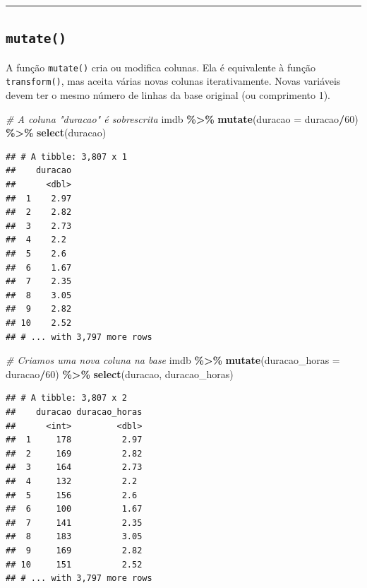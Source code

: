 \documentclass[
]{book}
\newenvironment{Shaded}{\begin{snugshade}}{\end{snugshade}}
\newcommand{\CommentTok}[1]{\textcolor[rgb]{0.56,0.35,0.01}{\textit{#1}}}
\newcommand{\DataTypeTok}[1]{\textcolor[rgb]{0.13,0.29,0.53}{#1}}
\newcommand{\DecValTok}[1]{\textcolor[rgb]{0.00,0.00,0.81}{#1}}
\newcommand{\KeywordTok}[1]{\textcolor[rgb]{0.13,0.29,0.53}{\textbf{#1}}}
\newcommand{\NormalTok}[1]{#1}
\newcommand{\OperatorTok}[1]{\textcolor[rgb]{0.81,0.36,0.00}{\textbf{#1}}}
\newcommand{\StringTok}[1]{\textcolor[rgb]{0.31,0.60,0.02}{#1}}
\begin{document}
\begin{center}\rule{0.5\linewidth}{0.5pt}\end{center}

\hypertarget{mutate}{%
\subsection{\texorpdfstring{\texttt{mutate()}}{mutate()}}\label{mutate}}

A função \texttt{mutate()} cria ou modifica colunas. Ela é equivalente à função \texttt{transform()}, mas aceita várias novas colunas iterativamente. Novas variáveis devem ter o mesmo número de linhas da base original (ou comprimento 1).

\begin{Shaded}
\begin{Highlighting}[]
\CommentTok{\# A coluna "duracao" é sobrescrita}
\NormalTok{imdb }\OperatorTok{\%>\%}
\StringTok{  }\KeywordTok{mutate}\NormalTok{(}\DataTypeTok{duracao =}\NormalTok{ duracao}\OperatorTok{/}\DecValTok{60}\NormalTok{) }\OperatorTok{\%>\%}
\StringTok{  }\KeywordTok{select}\NormalTok{(duracao)}
\end{Highlighting}
\end{Shaded}

\begin{verbatim}
## # A tibble: 3,807 x 1
##    duracao
##      <dbl>
##  1    2.97
##  2    2.82
##  3    2.73
##  4    2.2 
##  5    2.6 
##  6    1.67
##  7    2.35
##  8    3.05
##  9    2.82
## 10    2.52
## # ... with 3,797 more rows
\end{verbatim}

\begin{Shaded}
\begin{Highlighting}[]
\CommentTok{\# Criamos uma nova coluna na base}
\NormalTok{imdb }\OperatorTok{\%>\%}
\StringTok{  }\KeywordTok{mutate}\NormalTok{(}\DataTypeTok{duracao\_horas =}\NormalTok{ duracao}\OperatorTok{/}\DecValTok{60}\NormalTok{) }\OperatorTok{\%>\%}
\StringTok{  }\KeywordTok{select}\NormalTok{(duracao, duracao\_horas)}
\end{Highlighting}
\end{Shaded}

\begin{verbatim}
## # A tibble: 3,807 x 2
##    duracao duracao_horas
##      <int>         <dbl>
##  1     178          2.97
##  2     169          2.82
##  3     164          2.73
##  4     132          2.2 
##  5     156          2.6 
##  6     100          1.67
##  7     141          2.35
##  8     183          3.05
##  9     169          2.82
## 10     151          2.52
## # ... with 3,797 more rows
\end{verbatim}
\end{document}
